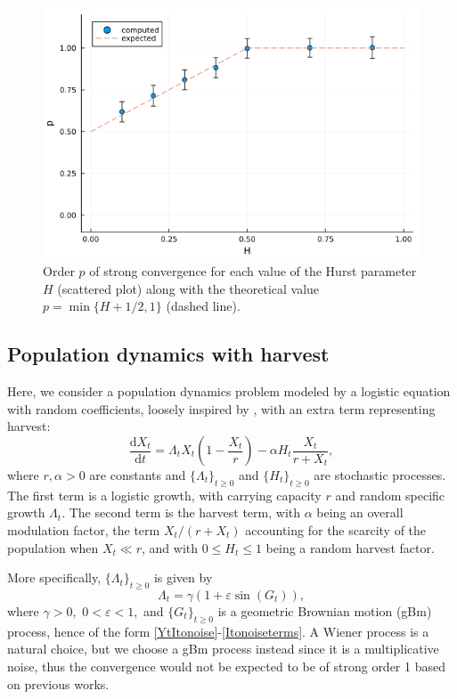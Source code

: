 \documentclass[reqno,12pt]{amsart}
\theoremstyle{plain} %
\theoremstyle{definition} %
\begin{document}
\begin{figure}[htb]
    \includegraphics[scale=0.6]{img/order_dep_on_H_fBm.png}
    \caption{Order $p$ of strong convergence for each value of the Hurst parameter $H$ (scattered plot) along with the theoretical value $p=\min\{H + 1/2, 1\}$ (dashed line).}
    \label{figorderdepHfBm}
\end{figure}

\subsection{Population dynamics with harvest}
\label{secpopdyn}

Here, we consider a population dynamics problem modeled by a logistic equation with random coefficients, loosely inspired by \cite[Section 15.2]{HanKloeden2017}, with an extra term representing harvest:
\begin{equation}
    \label{rodepopulationdynamics}
    \frac{\mathrm{d}X_t}{\mathrm{d}t} = \Lambda_t X_t (1 - \frac{X_t}{r}) - \alpha H_t \frac{X_t}{r + X_t},
\end{equation}
where $r, \alpha > 0$ are constants and $\{\Lambda_t\}_{t \geq 0}$ and $\{H_t\}_{t \geq 0}$ are stochastic processes. The first term is a logistic growth, with carrying capacity $r$ and random specific growth $\Lambda_t$. The second term is the harvest term, with $\alpha$ being an overall modulation factor, the term $X_t / (r + X_t)$ accounting for the scarcity of the population when $X_t \ll r$, and with $0 \leq H_t \leq 1$ being a random harvest factor. 

More specifically, $\{\Lambda_t\}_{t \geq 0}$ is given by
\[
    \Lambda_t = \gamma (1 + \varepsilon \sin(G_t)),
\]
where $\gamma > 0,$ $0 < \varepsilon < 1,$ and $\{G_t\}_{t\geq 0}$ is a geometric Brownian motion (gBm) process, hence of the form \eqref{YtItonoise}-\eqref{Itonoiseterms}. A Wiener process is a natural choice, but we choose a gBm process instead since it is a multiplicative noise, thus the convergence would not be expected to be of strong order 1 based on previous works.
\end{document}
